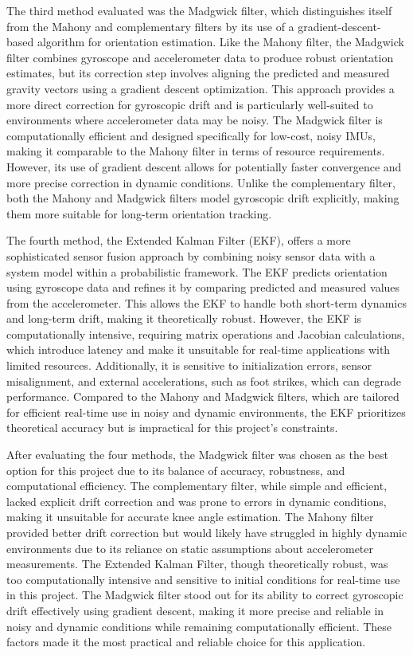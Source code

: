 The third method evaluated was the Madgwick filter, which distinguishes itself from the Mahony and complementary filters by its use of a gradient-descent-based algorithm for orientation estimation. Like the Mahony filter, the Madgwick filter combines gyroscope and accelerometer data to produce robust orientation estimates, but its correction step involves aligning the predicted and measured gravity vectors using a gradient descent optimization. This approach provides a more direct correction for gyroscopic drift and is particularly well-suited to environments where accelerometer data may be noisy. The Madgwick filter is computationally efficient and designed specifically for low-cost, noisy IMUs, making it comparable to the Mahony filter in terms of resource requirements. However, its use of gradient descent allows for potentially faster convergence and more precise correction in dynamic conditions. Unlike the complementary filter, both the Mahony and Madgwick filters model gyroscopic drift explicitly, making them more suitable for long-term orientation tracking.

The fourth method, the Extended Kalman Filter (EKF), offers a more sophisticated sensor fusion approach by combining noisy sensor data with a system model within a probabilistic framework. The EKF predicts orientation using gyroscope data and refines it by comparing predicted and measured values from the accelerometer. This allows the EKF to handle both short-term dynamics and long-term drift, making it theoretically robust. However, the EKF is computationally intensive, requiring matrix operations and Jacobian calculations, which introduce latency and make it unsuitable for real-time applications with limited resources. Additionally, it is sensitive to initialization errors, sensor misalignment, and external accelerations, such as foot strikes, which can degrade performance. Compared to the Mahony and Madgwick filters, which are tailored for efficient real-time use in noisy and dynamic environments, the EKF prioritizes theoretical accuracy but is impractical for this project's constraints.

After evaluating the four methods, the Madgwick filter was chosen as the best option for this project due to its balance of accuracy, robustness, and computational efficiency. The complementary filter, while simple and efficient, lacked explicit drift correction and was prone to errors in dynamic conditions, making it unsuitable for accurate knee angle estimation. The Mahony filter provided better drift correction but would likely have struggled in highly dynamic environments due to its reliance on static assumptions about accelerometer measurements. The Extended Kalman Filter, though theoretically robust, was too computationally intensive and sensitive to initial conditions for real-time use in this project. The Madgwick filter stood out for its ability to correct gyroscopic drift effectively using gradient descent, making it more precise and reliable in noisy and dynamic conditions while remaining computationally efficient. These factors made it the most practical and reliable choice for this application.

